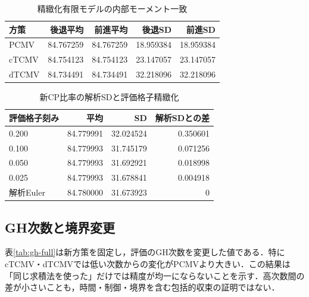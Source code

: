 \documentclass[11pt,a4paper]{article}
\numberwithin{equation}{section}
\numberwithin{table}{section}
\numberwithin{figure}{section}
\theoremstyle{plain}
\theoremstyle{definition}
\begin{document}
\begin{table}[htbp]\centering\small
\caption{精緻化有限モデルの内部モーメント一致}\label{tab:internal-full}
\begin{tabular}{lrrrr}\toprule
方策 & 後退平均 & 前進平均 & 後退SD & 前進SD \\ \midrule
PCMV & 84.767259 & 84.767259 & 18.959384 & 18.959384 \\
cTCMV & 84.754123 & 84.754123 & 23.147057 & 23.147057 \\
dTCMV & 84.734491 & 84.734491 & 32.218096 & 32.218096 \\
\bottomrule\end{tabular}\end{table}

\begin{table}[htbp]\centering\small
\caption{新CP比率の解析SDと評価格子精緻化}\label{tab:cp-refine}
\begin{tabular}{lrrr}\toprule
評価格子刻み & 平均 & SD & 解析SDとの差 \\ \midrule
0.200 & 84.779991 & 32.024524 & 0.350601 \\
0.100 & 84.779993 & 31.745179 & 0.071256 \\
0.050 & 84.779993 & 31.692921 & 0.018998 \\
0.025 & 84.779993 & 31.678841 & 0.004918 \\
解析Euler & 84.780000 & 31.673923 & 0 \\
\bottomrule\end{tabular}\end{table}

\subsection{GH次数と境界変更}
表\ref{tab:gh-full}は新方策を固定し，評価のGH次数を変更した値である．特にcTCMV・dTCMVでは低い次数からの変化がPCMVより大きい．この結果は「同じ求積法を使った」だけでは精度が均一にならないことを示す．高次数間の差が小さいことも，時間・制御・境界を含む包括的収束の証明ではない．
\end{document}
